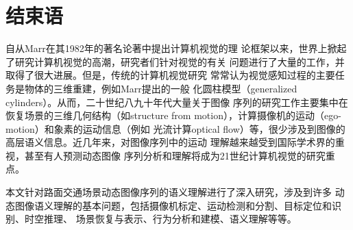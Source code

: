\chapter{结束语}
\label{chap7}

自从Marr在其1982年的著名论著\cite{Marr:1982}中提出计算机视觉的理
论框架以来，世界上掀起了研究计算机视觉的高潮，研究者们针对视觉的有关
问题进行了大量的工作，并取得了很大进展。但是，传统的计算机视觉研究
常常认为视觉感知过程的主要任务是物体的三维重建，例如Marr提出的一般
化圆柱模型（generalized
cylinders）\cite{Marr:1982}。从而，二十世纪八九十年代大量关于图像
序列的研究工作主要集中在恢复场景的三维几何结构（如structure from
motion），计算摄像机的运动（ego-motion）和象素的运动信息（例如 光流计算optical
flow）等，很少涉及到图像的高层语义信息。近几年来，对图像序列中的运动
理解越来越受到国际学术界的重视，甚至有人预测动态图像
序列分析和理解将成为21世纪计算机视觉的研究重点。

本文针对路面交通场景动态图像序列的语义理解进行了深入研究，涉及到许多
动态图像语义理解的基本问题，包括摄像机标定、运动检测和分割、目标定位和识别、时空推理、
场景恢复与表示、行为分析和建模、语义理解等等。
